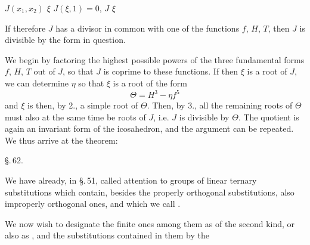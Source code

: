 
 $J(x_1, x_2)$  $\xi$  $J(\xi, 1) = 0$,  $J$  $\xi$ 

If therefore $J$ has a divisor in common with one of the functions $f$, $H$, $T$, then $J$ is divisible by the form in question.

We begin by factoring the highest possible powers of the three fundamental forms $f$, $H$, $T$ out of $J$, so that $J$ is coprime to these functions. If then $\xi$ is a root of $J$, we can determine $\eta$ so that $\xi$ is a root of the form
\[
\Theta = H^3 - \eta f^5
\]
and $\xi$ is then, by 2., a simple root of $\Theta$. Then, by 3., all the remaining roots of $\Theta$ must also at the same time be roots of $J$, i.e. $J$ is divisible by $\Theta$. The quotient is again an invariant form of the icosahedron, and the argument can be repeated. We thus arrive at the theorem:


\begin{center}
\S.\,62.\\
\end{center}

We have already, in \S.\,51, called attention to groups of linear ternary substitutions which contain, besides the properly orthogonal substitutions, also improperly orthogonal ones, and which we call .

We now wish to designate the finite ones among them as  of the second kind, or also as , and the substitutions contained in them by the
